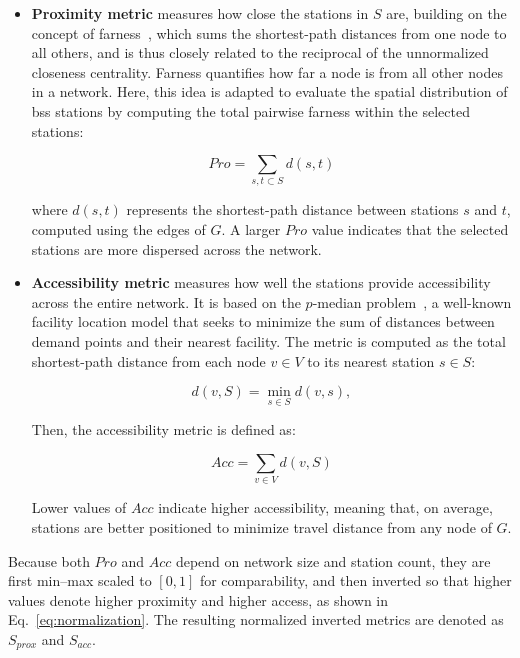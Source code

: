         \begin{itemize}
            \item \textbf{Proximity metric} measures how close the stations in $S$ are, building on the concept of farness~\cite{Sabidussi1966}, which sums the shortest-path distances from one node to all others, and is thus closely related to the reciprocal of the unnormalized closeness centrality. Farness quantifies how far a node is from all other nodes in a network. Here, this idea is adapted to evaluate the spatial distribution of \ac{bss} stations by computing the total pairwise farness within the selected stations:

                \begin{equation}
                    Pro = \sum_{{s,t} \subset S} d(s,t)
                \end{equation}

            where $d(s,t)$ represents the shortest-path distance between stations $s$ and $t$, computed using the edges of $G$. A larger $Pro$ value indicates that the selected stations are more dispersed across the network.

            \item \textbf{Accessibility metric} measures how well the stations provide accessibility across the entire network. It is based on the $p$-median problem~\cite{Daskin2015, Revelle2008}, a well-known facility location model that seeks to minimize the sum of distances between demand points and their nearest facility. The metric is computed as the total shortest-path distance from each node $v \in V$ to its nearest station $s \in S$:

                \begin{equation}
                    d(v, S) = \min_{s \in S} d(v,s),
                \end{equation}

            Then, the accessibility metric is defined as:
                
                \begin{equation}
                    Acc = \sum_{v \in V} d(v, S)
                \end{equation}

            Lower values of $Acc$ indicate higher accessibility, meaning that, on average, stations are better positioned to minimize travel distance from any node of $G$.
        \end{itemize}

        Because both $Pro$ and $Acc$ depend on network size and station count, they are first min–max scaled to $[0,1]$ for comparability, and then inverted so that higher values denote higher proximity and higher access, as shown in Eq.~\ref{eq:normalization}. The resulting normalized inverted metrics are denoted as $S_{prox}$ and $S_{acc}$.

